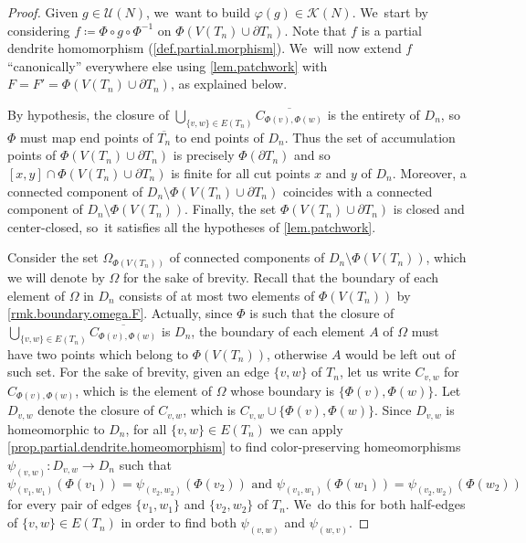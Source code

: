 \documentclass[JEP,XML,SOM,Unicode,NoFloatCountersInSection,published]{cedram}
\theoremstyle{plain}
\theoremstyle{definition}
\theoremstyle{remark}
\newcommand{\U}{\mathcal{U}}
\newcommand{\K}{\mathcal{K}}
\begin{document}
\begin{proof}
Given $g \in \U(N)$, we~want to build $\varphi(g) \in \K(N)$. We~start by considering $f \coloneqq \Phi \circ g \circ \Phi^{-1}$ on $\Phi \left( V(T_n) \cup \partial T_n \right)$.
Note that $f$ is a partial dendrite homomorphism (\cref{def.partial.morphism}). We~will now extend $f$ ``canonically'' everywhere else using \cref{lem.patchwork} with $F=F'=\Phi \left( V(T_n) \cup \partial T_n \right)$, as explained below.

By hypothesis, the closure of $\bigcup_{\{v,w\}\in E(T_n)} \overline{C_{\Phi(v),\Phi(w)}}$ is the entirety of $D_n$, so~$\Phi$ must map end points of $\overline{T_n}$ to end points of $D_n$.
Thus the set of accumulation points of $\Phi \left( V(T_n) \cup \partial T_n \right)$ is precisely $\Phi(\partial T_n)$ and so $[x,y] \cap \Phi\left( V(T_n) \cup \partial T_n \right)$ is finite for all cut points $x$ and $y$ of $D_n$.
Moreover, a connected component of $D_n\setminus\Phi \left( V(T_n) \cup \partial T_n \right)$ coincides with a connected component of $D_n\setminus\Phi \left(V(T_n)\right)$.
Finally, the set $\Phi\left( V(T_n) \cup \partial T_n \right)$ is closed and center-closed, so~it satisfies all the hypotheses of \cref{lem.patchwork}.

Consider the set $\Omega_{\Phi(V(T_n))}$ of connected components of $D_n \setminus \Phi(V(T_n))$, which we will denote by $\Omega$ for the sake of brevity.
Recall that the boundary of each element of $\Omega$ in $D_n$ consists of at most two elements of $\Phi(V(T_n))$ by \cref{rmk.boundary.omega.F}.
Actually, since $\Phi$ is such that the closure of $\bigcup_{\{v,w\}\in E(T_n)} \overline{C_{\Phi(v),\Phi(w)}}$ is $D_n$, the boundary of each element $A$ of $\Omega$ must have two points which belong to $\Phi(V(T_n))$, otherwise $A$ would be left out of such set.
For the sake of brevity, given an edge $\{v,w\}$ of $T_n$, let us write $C_{v,w}$ for $C_{\Phi(v),\Phi(w)}$, which is the element of $\Omega$ whose boundary is $\{\Phi(v),\Phi(w)\}$.
Let $D_{v,w}$ denote the closure of $C_{v,w}$, which is $C_{v,w} \cup \{\Phi(v),\Phi(w)\}$.
Since $D_{v,w}$ is homeomorphic to $D_n$, for all $\{v,w\} \in E(T_n)$ we can apply \cref{prop.partial.dendrite.homeomorphism} to find color-preserving homeomorphisms $\psi_{(v,w)} \colon D_{v,w} \to D_n$ such that\vspace*{-3pt}
\[
 \psi_{(v_1,w_1)}(\Phi(v_1)) = \psi_{(v_2,w_2)}(\Phi(v_2)) \text{ and } \psi_{(v_1,w_1)}(\Phi(w_1)) = \psi_{(v_2,w_2)}(\Phi(w_2)) 
\]
for every pair of edges $\{v_1,w_1\}$ and $\{v_2,w_2\}$ of $T_n$. We~do this for both half-edges of $\{v,w\} \in E(T_n)$ in order to find both $\psi_{(v,w)}$ and $\psi_{(w,v)}$.


\end{proof}
\end{document}
